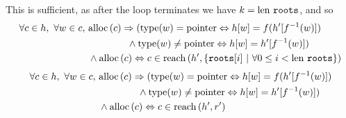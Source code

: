 This is sufficient, as after the loop terminates we have $k = \mathrm{len}~
\mathtt{roots}$, and so
\begin{align*}
  \forall c \in h,\ \forall w \in c,\ &\mathrm{alloc}\left(c\right) \Rightarrow
  (\mathrm{type}(w) = \mathrm{pointer} \Leftrightarrow h[w] = f(h'[f^{-1}(w)])\\
  &\quad\quad\quad\quad \land \mathrm{type}(w) \neq \mathrm{pointer}
  \Leftrightarrow h[w] = h'[f^{-1}(w)])\\
  &\land \mathrm{alloc}\left(c\right) \Leftrightarrow c \in \mathrm{reach}\left(h', \{\mathtt{roots}[i]~|~\forall
    0 \leq i < \mathrm{len}~\mathtt{roots}\}\right)
\end{align*}
\begin{align*}
  \forall c \in h,\ \forall w \in c,\ &\mathrm{alloc}\left(c\right) \Rightarrow
  (\mathrm{type}(w) = \mathrm{pointer} \Leftrightarrow h[w] = f(h'[f^{-1}(w)])\\
  &\quad\quad\quad\quad \land \mathrm{type}(w) \neq \mathrm{pointer}
  \Leftrightarrow h[w] = h'[f^{-1}(w)])\\
  &\land \mathrm{alloc}\left(c\right) \Leftrightarrow c \in \mathrm{reach}\left(h', r'\right)
\end{align*}

